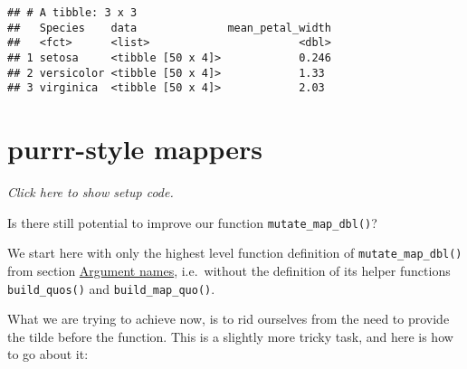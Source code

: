 \documentclass[]{book}
\newenvironment{Shaded}{\begin{snugshade}}{\end{snugshade}}
\newcommand{\ControlFlowTok}[1]{\textcolor[rgb]{0.13,0.29,0.53}{\textbf{#1}}}
\newcommand{\KeywordTok}[1]{\textcolor[rgb]{0.13,0.29,0.53}{\textbf{#1}}}
\newcommand{\NormalTok}[1]{#1}
\newcommand{\OperatorTok}[1]{\textcolor[rgb]{0.81,0.36,0.00}{\textbf{#1}}}
\newcommand{\StringTok}[1]{\textcolor[rgb]{0.31,0.60,0.02}{#1}}
\begin{document}
\begin{verbatim}
## # A tibble: 3 x 3
##   Species    data              mean_petal_width
##   <fct>      <list>                       <dbl>
## 1 setosa     <tibble [50 x 4]>            0.246
## 2 versicolor <tibble [50 x 4]>            1.33 
## 3 virginica  <tibble [50 x 4]>            2.03
\end{verbatim}

\hypertarget{purrr-style-mappers}{%
\section{purrr-style mappers}\label{purrr-style-mappers}}

\emph{Click here to show setup code.}

\begin{Shaded}
\end{Shaded}

Is there still potential to improve our function \texttt{mutate\_map\_dbl()}?

We start here with only the highest level function definition of \texttt{mutate\_map\_dbl()} from section \protect\hyperlink{argnames}{Argument names}, i.e.~without the definition of its helper functions \texttt{build\_quos()} and \texttt{build\_map\_quo()}.

What we are trying to achieve now, is to rid ourselves from the need to provide the tilde before the function.
This is a slightly more tricky task, and here is how to go about it:
\end{document}
